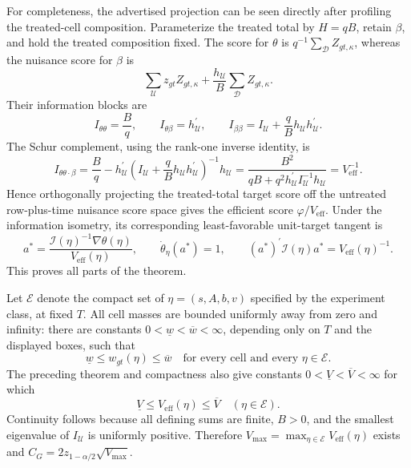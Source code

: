 For completeness, the advertised projection can be seen directly after
profiling the treated-cell composition.  Parameterize the treated total by
\(H=qB\), retain \(\beta\), and hold the treated composition fixed.  The
score for \(\theta\) is \(q^{-1}\sum_{\mathcal D}Z_{gt,\kappa}\), whereas
the nuisance score for \(\beta\) is
\[
 \sum_{\mathcal U}z_{gt}Z_{gt,\kappa}
   +\frac{h_{\mathcal U}}{B}\sum_{\mathcal D}Z_{gt,\kappa}.
\]
Their information blocks are
\[
 I_{\theta\theta}=\frac{B}{q},
 \qquad I_{\theta\beta}=h_{\mathcal U}^{\prime},
 \qquad I_{\beta\beta}=I_{\mathcal U}+\frac{q}{B}h_{\mathcal U}h_{\mathcal U}^{\prime}.
\]
The Schur complement, using the rank-one inverse identity, is
\[
 I_{\theta\theta\cdot\beta}
 =\frac{B}{q}
   -h_{\mathcal U}^{\prime}
      \left(I_{\mathcal U}+\frac{q}{B}h_{\mathcal U}h_{\mathcal U}^{\prime}\right)^{-1}
      h_{\mathcal U}
 =\frac{B^2}{qB+q^2h_{\mathcal U}^{\prime}I_{\mathcal U}^{-1}h_{\mathcal U}}
 =V_{\mathrm{eff}}^{-1}.
\]
Hence orthogonally projecting the treated-total target score off the
untreated row-plus-time nuisance score space gives the efficient score
\(\varphi/V_{\mathrm{eff}}\).  Under the information isometry, its
corresponding least-favorable unit-target tangent is
\[
 a^*=\frac{\mathcal I(\eta)^{-1}\nabla\theta(\eta)}{V_{\mathrm{eff}}(\eta)},
 \qquad
 \dot\theta_{\eta}(a^*)=1,
 \qquad
 (a^*)^{\prime}\mathcal I(\eta)a^*=V_{\mathrm{eff}}(\eta)^{-1}.
\]
This proves all parts of the theorem.

Let \(\mathcal E\) denote the compact set of \(\eta=(s,A,b,v)\) specified
by the experiment class, at fixed \(T\).  All cell masses are bounded
uniformly away from zero and infinity: there are constants
\(0<\underline w<\overline w<\infty\), depending only on \(T\) and the
displayed boxes, such that
\[
 \underline w\leq w_{gt}(\eta)\leq\overline w
 \quad\text{for every cell and every }\eta\in\mathcal E.
\]
The preceding theorem and compactness also give constants
\(0<\underline V<\overline V<\infty\) for which
\[
 \underline V\leq V_{\mathrm{eff}}(\eta)\leq\overline V
 \quad (\eta\in\mathcal E).
\]
Continuity follows because all defining sums are finite, \(B>0\), and the
smallest eigenvalue of \(I_{\mathcal U}\) is uniformly positive.  Therefore
\(V_{\max}=\max_{\eta\in\mathcal E}V_{\mathrm{eff}}(\eta)\) exists and
\(C_G=2z_{1-\alpha/2}\sqrt{V_{\max}}\).

